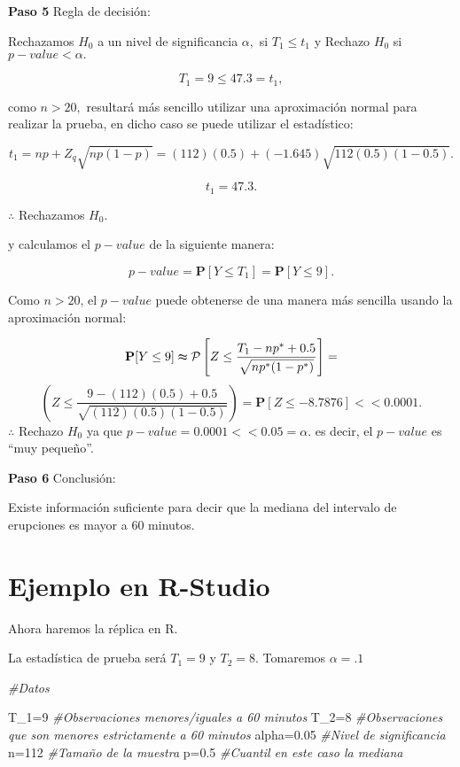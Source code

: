 \documentclass[
  a4paper,
  oneside,
  openany]{book}
\newenvironment{Shaded}{\begin{snugshade}}{\end{snugshade}}
\newcommand{\CommentTok}[1]{\textcolor[rgb]{0.56,0.35,0.01}{\textit{#1}}}
\newcommand{\DecValTok}[1]{\textcolor[rgb]{0.00,0.00,0.81}{#1}}
\newcommand{\FloatTok}[1]{\textcolor[rgb]{0.00,0.00,0.81}{#1}}
\newcommand{\NormalTok}[1]{#1}
\newcommand{\OtherTok}[1]{\textcolor[rgb]{0.56,0.35,0.01}{#1}}
\begin{document}
\textbf{Paso 5} Regla de decisión:

Rechazamos \(H_0\) a un nivel de significancia \(\alpha,\) si \(T_{1} \leq t_{1}\) y Rechazo \(H_0\) si \(p-value<\alpha.\)

\[T_{1}=9 \leq 47.3=t_{1},\]

como \(n>20,\) resultará más sencillo utilizar una aproximación normal para realizar la prueba, en dicho caso se puede utilizar el estadístico:

\[t_{1}=np+Z_{q}\sqrt{np(1-p)}=(112)(0.5)+(-1.645)\sqrt{112(0.5)(1-0.5)}.\]

\[t_{1}=47.3.\]

\(\therefore\) Rechazamos \(H_0.\)

y calculamos el \(p-value\) de la siguiente manera:

\[p-value= \mathbf{P}[Y\leq T_{1}]=\mathbf{P}[Y\leq 9].\]

Como \(n > 20\), el \(p-value\) puede obtenerse de una manera más sencilla usando la aproximación normal:

\[\mathbf{P}[Y\leq 9] \thickapprox \mathcal{P} \left[Z\leq\frac{T_{1}-np^*+0.5}{\sqrt{np^*(1-p^*)}}\right]=\]
\[\left(Z\leq\frac{9-(112)(0.5)+0.5}{\sqrt{(112)(0.5)(1-0.5)}}\right)=\mathbf{P}[Z\leq -8.7876] < < 0.0001.\]
\(\therefore\) Rechazo \(H_0\) ya que \(p-value=0.0001<<0.05=\alpha.\) es decir, el \(p-value\) es ``muy pequeño''.

\textbf{Paso 6} Conclusión:

Existe información suficiente para decir que la mediana del intervalo de erupciones es mayor a 60 minutos.

\hypertarget{ejemplo-en-r-studio-1}{%
\section{Ejemplo en R-Studio}\label{ejemplo-en-r-studio-1}}

Ahora haremos la réplica en R.

La estadística de prueba será \(T_1=9\) y \(T_2=8\). Tomaremos \(\alpha=.1\)

\begin{Shaded}
\begin{Highlighting}[]
\CommentTok{\#Datos}

\NormalTok{T\_1}\OtherTok{=}\DecValTok{9}         \CommentTok{\#Observaciones menores/iguales a 60 minutos}
\NormalTok{T\_2}\OtherTok{=}\DecValTok{8}         \CommentTok{\#Observaciones que son menores estrictamente a 60 minutos}
\NormalTok{alpha}\OtherTok{=}\FloatTok{0.05}    \CommentTok{\#Nivel de significancia}
\NormalTok{n}\OtherTok{=}\DecValTok{112}         \CommentTok{\#Tamaño de la muestra}
\NormalTok{p}\OtherTok{=}\FloatTok{0.5}         \CommentTok{\#Cuantil en este caso la mediana }
\end{Highlighting}
\end{Shaded}
\end{document}
